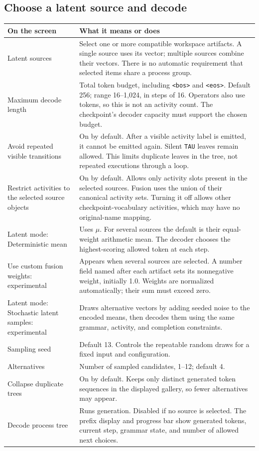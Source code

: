 \documentclass[11pt,a4paper]{article}
\makeatletter
\newcommand{\code}[1]{\nolinkurl{#1}}
\newenvironment{controls}{%
  \small\begin{longtable}{@{}>{\raggedright\arraybackslash}p{.34\linewidth}
    >{\raggedright\arraybackslash}p{.62\linewidth}@{}}
  \toprule\textbf{On the screen} & \textbf{What it means or does}\\\midrule\endhead
  \bottomrule\endfoot
}{\end{longtable}\normalsize}
\makeatother
\begin{document}
\subsection{Choose a latent source and decode}
\begin{controls}
Latent sources & Select one or more compatible workspace artifacts. A single
source uses its vector; multiple sources combine their vectors. There is no
automatic requirement that selected items share a process group.\\
Maximum decode length & Total token budget, including \code{<bos>} and
\code{<eos>}. Default 256; range 16--1,024, in steps of 16. Operators also
use tokens, so this is not an activity count. The checkpoint's decoder capacity
must support the chosen budget.\\
Avoid repeated visible transitions & On by default. After a visible activity
label is emitted, it cannot be emitted again. Silent \code{TAU} leaves remain
allowed. This limits duplicate leaves in the tree, not repeated executions
through a loop.\\
Restrict activities to the selected source objects & On by default. Allows
only activity slots present in the selected sources. Fusion uses the union of
their canonical activity sets. Turning it off allows other checkpoint-vocabulary
activities, which may have no original-name mapping.\\
Latent mode: Deterministic mean & Uses $\mu$. For several sources the default
is their equal-weight arithmetic mean. The decoder chooses the highest-scoring
allowed token at each step.\\
Use custom fusion weights: experimental & Appears when several sources are
selected. A number field named after each artifact sets its nonnegative weight,
initially 1.0. Weights are normalized automatically; their sum must exceed zero.\\
Latent mode: Stochastic latent samples: experimental & Draws alternative
vectors by adding seeded noise to the encoded means, then decodes them using
the same grammar, activity, and completion constraints.\\
Sampling seed & Default 13. Controls the repeatable random draws for a fixed
input and configuration.\\
Alternatives & Number of sampled candidates, 1--12; default 4.\\
Collapse duplicate trees & On by default. Keeps only distinct generated token
sequences in the displayed gallery, so fewer alternatives may appear.\\
Decode process tree & Runs generation. Disabled if no source is selected.
The prefix display and progress bar show generated tokens, current step,
grammar state, and number of allowed next choices.\\
\end{controls}
\end{document}
